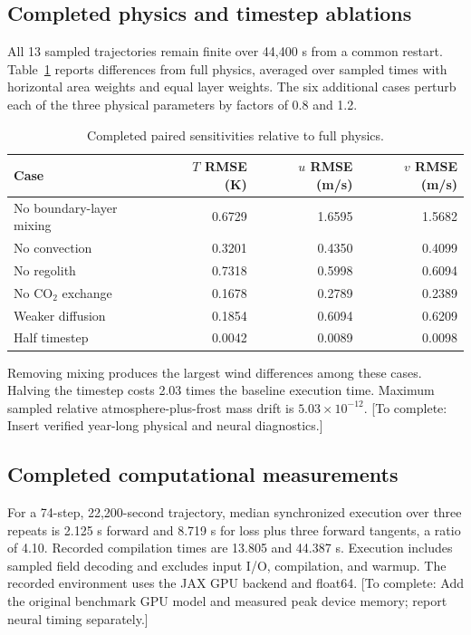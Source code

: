 \documentclass{article}
\newcommand{\pending}[1]{\textcolor{blue!65!black}{[To complete: #1]}}
\begin{document}
\subsection{Completed physics and timestep ablations}
All 13 sampled trajectories remain finite over 44,400 s from a common restart.
Table~\ref{tab:ablations} reports differences from full physics, averaged
over sampled times with horizontal area weights and equal layer weights.
The six additional cases perturb each of the three physical parameters by
factors of 0.8 and 1.2.
\begin{table}[t]
\centering
\caption{Completed paired sensitivities relative to full physics.}
\begin{tabular}{lrrr}
\toprule
Case & \(T\) RMSE (K) & \(u\) RMSE (m/s) & \(v\) RMSE (m/s)\\
\midrule
No boundary-layer mixing & 0.6729 & 1.6595 & 1.5682\\
No convection & 0.3201 & 0.4350 & 0.4099\\
No regolith & 0.7318 & 0.5998 & 0.6094\\
No CO$_2$ exchange & 0.1678 & 0.2789 & 0.2389\\
Weaker diffusion & 0.1854 & 0.6094 & 0.6209\\
Half timestep & 0.0042 & 0.0089 & 0.0098\\
\bottomrule
\end{tabular}
\label{tab:ablations}
\end{table}
Removing mixing produces the largest wind differences among these cases.
Halving the timestep costs 2.03 times the baseline execution time.
Maximum sampled relative atmosphere-plus-frost mass drift is
\(5.03\times10^{-12}\).
\pending{Insert verified year-long physical and neural diagnostics.}

\subsection{Completed computational measurements}
For a 74-step, 22,200-second trajectory, median synchronized execution over
three repeats is 2.125 s forward and 8.719 s for loss plus three forward
tangents, a ratio of 4.10. Recorded compilation times are 13.805 and 44.387 s.
Execution includes sampled field decoding and excludes input I/O, compilation,
and warmup. The recorded environment uses the JAX GPU backend and float64.
\pending{Add the original benchmark GPU model and measured peak device memory;
report neural timing separately.}
\end{document}
